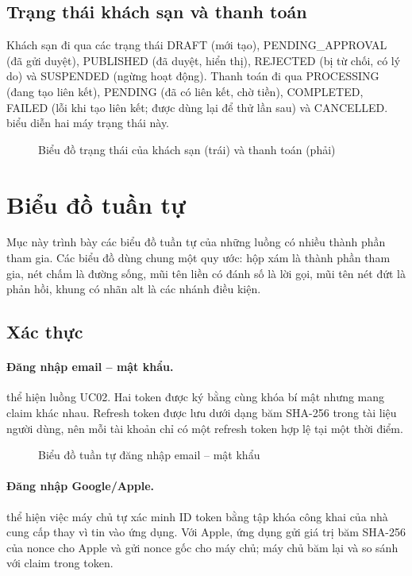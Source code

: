 \subsection{Trạng thái khách sạn và thanh toán}

Khách sạn đi qua các trạng thái DRAFT (mới tạo), PENDING\_APPROVAL (đã gửi duyệt), PUBLISHED (đã duyệt, hiển thị), REJECTED (bị từ chối, có lý do) và SUSPENDED (ngừng hoạt động). Thanh toán đi qua PROCESSING (đang tạo liên kết), PENDING (đã có liên kết, chờ tiền), COMPLETED, FAILED (lỗi khi tạo liên kết; được dùng lại để thử lần sau) và CANCELLED.  biểu diễn hai máy trạng thái này.

\begin{figure}[H]
\centering
{}
\caption{Biểu đồ trạng thái của khách sạn (trái) và thanh toán (phải)}\label{fig:state-hotel-payment}
\end{figure}

\section{Biểu đồ tuần tự}\label{sec:sequences}

Mục này trình bày các biểu đồ tuần tự của những luồng có nhiều thành phần tham gia. Các biểu đồ dùng chung một quy ước: hộp xám là thành phần tham gia, nét chấm là đường sống, mũi tên liền có đánh số là lời gọi, mũi tên nét đứt là phản hồi, khung có nhãn alt là các nhánh điều kiện.

\subsection{Xác thực}\label{sec:auth-design}

\paragraph{Đăng nhập email -- mật khẩu.}  thể hiện luồng UC02. Hai token được ký bằng cùng khóa bí mật nhưng mang claim  khác nhau. Refresh token được lưu dưới dạng băm SHA-256 trong tài liệu người dùng, nên mỗi tài khoản chỉ có một refresh token hợp lệ tại một thời điểm.

\begin{figure}[H]
\centering
{}
\caption{Biểu đồ tuần tự đăng nhập email -- mật khẩu}\label{fig:seq-login}
\end{figure}

\paragraph{Đăng nhập Google/Apple.}  thể hiện việc máy chủ tự xác minh ID token bằng tập khóa công khai của nhà cung cấp thay vì tin vào ứng dụng. Với Apple, ứng dụng gửi giá trị băm SHA-256 của nonce cho Apple và gửi nonce gốc cho máy chủ; máy chủ băm lại và so sánh với claim  trong token.

